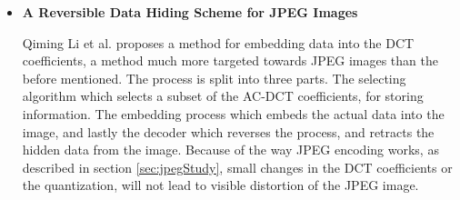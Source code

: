 \begin{itemize}
\begin{itemize}
		\item \textbf{A Reversible Data Hiding Scheme for JPEG Images}
		
		Qiming Li et al. proposes a method for embedding data into the DCT coefficients\citep{Li2010}, a method much more targeted towards JPEG images than the before mentioned.
		The process is split into three parts. The selecting algorithm which selects a subset of the AC-DCT coefficients, for storing information. 
		The embedding process which embeds the actual data into the image, and lastly the decoder which reverses the process, and retracts the hidden data from the image. 
		Because of the way JPEG encoding works, as described in section \ref{sec:jpegStudy}, small changes in the DCT coefficients or the quantization, will not lead to visible distortion of the JPEG image.

	\end{itemize}
\end{itemize}
